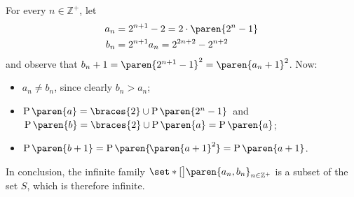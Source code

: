 For every $n \in \mathbb{Z}^{+}$, let
\begin{align*}
 a_n &= 2^{n + 1} - 2
      = 2 \cdot \paren{2^n - 1} \mspace{2mu} \\
 b_n &= 2^{n + 1} a_n
      = 2^{2 n + 2} - 2^{n + 2}
\end{align*}
and observe that $b_n + 1 = \paren{2^{n + 1} - 1}^2 = \paren{a_n + 1}^2$.
Now:
\begin{itemize}
  \item $a_n \neq b_n$, since clearly $b_n > a_n$;
  \item $\operatorname{P}\paren{a} = \braces{2} \cup \operatorname{P}\paren{2^n - 1} \mspace{2mu}$
        and $\mspace{2mu} \operatorname{P}\paren{b} = \braces{2} \cup \operatorname{P}\paren{a} = \operatorname{P}\paren{a}$;
  \item $\operatorname{P}\paren{b + 1}
         = \operatorname{P}\paren{\mspace{-2.2mu} \paren{a+1}^2 \mspace{-0.5mu}}
         = \operatorname{P}\paren{a + 1}$.
\end{itemize}

In conclusion, the infinite family $\set*[\big]{\paren{a_n, b_n}}_{n \in \mathbb{Z}^{+}}$
is a subset of the set $S$, which is therefore infinite.
